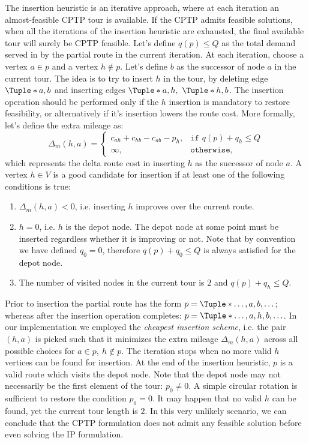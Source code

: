 The insertion heuristic is an iterative approach,
where at each iteration
an almost-feasible CPTP tour is available.
If the CPTP admits feasible solutions,
when all the iterations of the insertion heuristic are exhausted,
the final available tour will surely be CPTP feasible.
Let's define $q(p) \le Q$ as the total demand served
in by the partial route in the current iteration.
At each iteration,
choose a vertex $a \in p$ and a vertex $h \notin p$.
Let's define $b$ as the successor of node $a$ in the current tour.
The idea is to try to insert $h$ in the tour,
by deleting edge $\Tuple*{a, b}$
and inserting edges $\Tuple*{a, h},\ \Tuple*{h, b}$.
The insertion operation should be performed only
if the $h$ insertion is mandatory to restore feasibility,
or alternatively if it's insertion lowers the route cost.
More formally, let's define the extra mileage as:
\begin{equation}
	\Delta_m(h, a) =
	\begin{cases}
		c_{ah} + c_{hb} - c_{ab} - p_h, & \texttt{if } q(p) + q_h \le Q \\
		\infty,                         & \texttt{otherwise},
	\end{cases}
\end{equation}
which represents the delta route cost in inserting $h$ as the successor of node $a$.
A vertex $h \in V$ is a good candidate for insertion
if at least one of the following conditions is true:
\begin{enumerate}
	\item $\Delta_m(h, a) < 0$, i.e. inserting $h$ improves over the current route.
	\item $h = 0$, i.e. $h$ is the depot node.
	      The depot node at some point must be inserted regardless whether it is improving or not.
	      Note that by convention we have defined $q_0 = 0$,
	      therefore $q(p) + q_0 \le Q$ is always satisfied for the depot node.
	\item The number of visited nodes in the current tour is $2$ and $q(p) + q_h \le Q$.
\end{enumerate}

Prior to insertion the partial route has the form $p = \Tuple*{\dots, a, b, \dots}$;
whereas after the insertion operation completes: $p = \Tuple*{\dots, a, h, b, \dots}$.
In our implementation we employed the \textit{cheapest insertion scheme},
i.e. the pair $(h, a)$ is picked such that it minimizes the extra mileage $\Delta_m(h, a)$
across all possible choices for $a \in p,\ h \notin p$.
The iteration stops when no more valid $h$ vertices can be found for insertion.
At the end of the insertion heuristic, $p$ is a valid route which visits the depot node.
Note that the depot node may not necessarily be the first element of the tour: $p_0 \ne 0$.
A simple circular rotation is sufficient to restore the condition $p_0 = 0$.
It may happen that no valid $h$ can be found,
yet the current tour length is $2$.
In this very unlikely scenario,
we can conclude that the CPTP formulation does not admit any feasible solution
before even solving the IP formulation.

